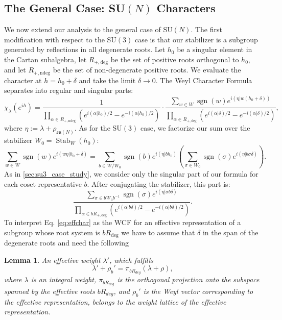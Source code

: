 \documentclass[11pt, a4paper]{article}
\DeclareMathOperator{\sgn}{sgn}
\DeclareMathOperator{\Stab}{Stab}
\newcommand{\su}{\mathfrak{su}}
\newtheorem{lemma}[theorem]{Lemma}
\theoremstyle{definition}
\theoremstyle{remark}
\begin{document}
\subsection{The General Case: SU$(N)$ Characters}
\label{sec:sun_proof}

We now extend our analysis to the general case of SU$(N)$. The first modification with respect to the SU$(3)$ case is that our stabilizer is a subgroup generated by reflections in all degenerate roots. Let $h_0$ be a singular element in the Cartan subalgebra, let $R_{+, \text{deg}}$ be the set of positive roots orthogonal to $h_0$, and let $R_{+, \text{ndeg}}$ be the set of non-degenerate positive roots. We evaluate the character at $h = h_0 + \delta$ and take the limit $\delta \to 0$. The Weyl Character Formula separates into regular and singular parts:
\begin{equation}
    \chi_\lambda(e^{ih}) = \frac{1}{\prod_{\alpha \in R_{+, \text{ndeg}}} \left(e^{i(\alpha|h_0)/2} - e^{-i(\alpha|h_0)/2}\right)} \cdot \frac{\sum_{w \in W} \sgn(w) e^{i(\eta|w(h_0+\delta))}}{\prod_{\alpha \in R_{+, \text{deg}}} \left(e^{i(\alpha|\delta)/2} - e^{-i(\alpha|\delta)/2}\right)},
\end{equation}
where $\eta := \lambda + \rho_{\su(N)}$. As for the SU$(3)$ case, we factorize our sum over the stabilizer $W_0 = \Stab_W(h_0)$:
\begin{equation}
    \sum_{w \in W} \sgn(w) e^{i(w\eta|h_0+\delta)} = \sum_{b \in W/W_0} \sgn(b) e^{i(\eta|b h_0)} \left( \sum_{\sigma \in W_0} \sgn(\sigma) e^{i(\eta|b\sigma \delta)} \right).
\end{equation}
As in \ref{sec:su3_case_study}, we consider only the singular part of our formula for each coset representative $b$. After conjugating the stabilizer, this part is:
\begin{equation}
    \label{eq:effchar}
    \frac{\sum_{\sigma \in bW_0b^{-1}} \sgn(\sigma) e^{i(\eta|\sigma b\delta)}}{\prod_{\alpha \in bR_{+, \text{deg}}} \left(e^{i(\alpha|b\delta)/2} - e^{-i(\alpha|b\delta)/2}\right)}.
\end{equation}
To interpret Eq. \eqref{eq:effchar} as the WCF for an effective representation of a subgroup whose root system is $bR_{\text{deg}}$ we have to assume that $\delta$ in the span of the degenerate roots and need the following

\begin{lemma}
\label{lemma:weights}
An effective weight $\lambda'$, which fulfills
$$
\lambda' + \rho_b' = \pi_{bR_{deg}}(\lambda + \rho),
$$
where $\lambda$ is an integral weight, $\pi_{bR_{deg}}$ is the orthogonal projection onto the subspace spanned by the effective roots $bR_{deg}$, and $\rho_b'$ is the Weyl vector corresponding to the effective representation, belongs to the weight lattice of the effective representation.
\end{lemma}
\end{document}
